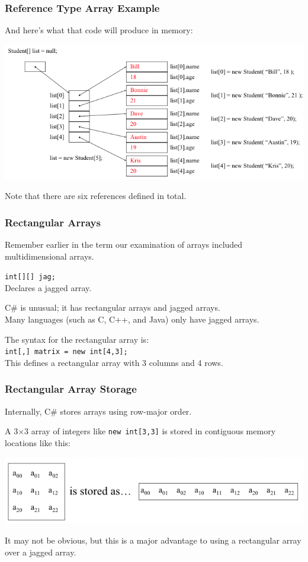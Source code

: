 \begin{frame}
\frametitle{Reference Type Array Example}

And here's what that code will produce in memory:

\begin{center}
\includegraphics[width=\textwidth]{images/students.png}
\end{center}

Note that there are six references defined in total.

\end{frame}



\begin{frame}
\frametitle{Rectangular Arrays}
Remember earlier in the term our examination of arrays included multidimensional arrays.

\texttt{int[][] jag;}\\
\quad Declares a jagged array.

C\# is unusual; it has \alert{rectangular arrays} and jagged arrays.\\
\quad Many languages (such as C, C++, and Java) only have jagged arrays.

The syntax for the rectangular array is:\\
\quad \texttt{int[,] matrix = new int[4,3];}\\
\quad This defines a rectangular array with 3 columns and 4 rows.

\end{frame}



\begin{frame}
\frametitle{Rectangular Array Storage}
Internally, C\# stores arrays using row-major order.

A 3$\times$3 array of integers like \texttt{new int[3,3]} is stored in contiguous memory locations like this:

\begin{center}
	\includegraphics[width=\textwidth]{images/rowmajor.png}
\end{center}

It may not be obvious, but this is a major advantage to using a rectangular array over a jagged array.

\end{frame}

